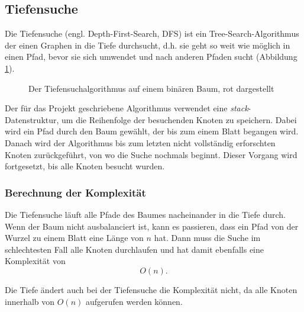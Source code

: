 \documentclass[a4paper,11pt]{article}
\begin{document}
\subsection{Tiefensuche}

Die Tiefensuche (engl. Depth-First-Search, DFS) ist ein Tree-Search-Algorithmus der einen Graphen in die Tiefe durchsucht, d.h. sie geht so weit wie möglich in einen Pfad, bevor sie sich umwendet und nach anderen Pfaden sucht (Abbildung \ref{fig:binary_tree_dfs}).

\begin{figure}[htbp]
\centering
{}
\caption{Der Tiefensuchalgorithmus auf einem binären Baum, rot dargestellt}
\label{fig:binary_tree_dfs}
\end{figure}

Der für das Projekt geschriebene Algorithmus verwendet eine \emph{stack}-Datenstruktur, um die Reihenfolge der besuchenden Knoten zu speichern. Dabei wird ein Pfad durch den Baum gewählt, der bis zum einem Blatt begangen wird. Danach wird der Algorithmus bis zum letzten nicht vollständig erforschten Knoten zurückgeführt, von wo die Suche nochmals beginnt. Dieser Vorgang wird fortgesetzt, bis alle Knoten besucht wurden.

\subsubsection{Berechnung der Komplexität}

Die Tiefensuche läuft alle Pfade des Baumes nacheinander in die Tiefe durch. Wenn der Baum nicht ausbalanciert ist, kann es passieren, dass ein Pfad von der Wurzel zu einem Blatt eine Länge von $n$ hat. Dann muss die Suche im schlechtesten Fall alle Knoten durchlaufen und hat damit ebenfalls eine Komplexität von $$O(n).$$

Die Tiefe ändert auch bei der Tiefensuche die Komplexität nicht, da alle Knoten innerhalb von $O(n)$ aufgerufen werden können.
\end{document}
